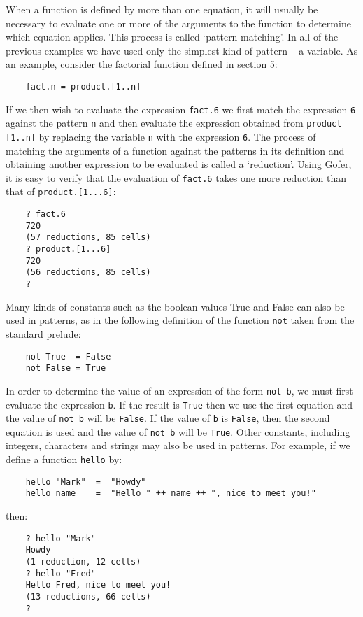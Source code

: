 When a function is defined by more than one equation, it  will  usually
be necessary to evaluate one or more of the arguments to  the  function
to  determine  which  equation  applies.   This   process   is   called
`pattern-matching'.  In all of the previous examples we have used  only
the simplest kind of pattern -- a variable.  As  an  example,  consider
the factorial function defined in section 5:
\begin{verbatim}
    fact.n = product.[1..n]
\end{verbatim}
If we then wish to evaluate the expression \verb"fact.6" we first match  the
expression \verb"6" against the pattern \verb"n" 
and then evaluate the expression
obtained from \verb"product [1..n]" by replacing 
the variable \verb"n"  with  the
expression \verb"6".  The process of matching the arguments  of  a  function
against the patterns in its definition and obtaining another expression
to be evaluated is called a `reduction'.  Using Gofer, it  is  easy  to
verify that the evaluation of \verb"fact.6" takes one  more  reduction  than
that of \verb"product.[1...6]":
\begin{verbatim}
    ? fact.6
    720
    (57 reductions, 85 cells)
    ? product.[1...6]
    720
    (56 reductions, 85 cells)
    ? 
\end{verbatim}
Many kinds of constants such as the boolean values True and  False  can
also be used in  patterns,  as  in  the  following  definition  of  the
function \verb"not" taken from the standard prelude:
\begin{verbatim}
    not True  = False
    not False = True
\end{verbatim}
In order to determine the value of an expression of the form  \verb"not b",
we must first evaluate the expression \verb"b".  If  the  result  is  \verb"True"
then we use the first equation  and  the  value  of  \verb"not b"  will  be
\verb"False".  If the value of \verb"b" is \verb"False", then the second  equation  is
used and the value of \verb"not b" will be \verb"True".
Other constants, including integers, characters and strings may also be
used in patterns.  For example, if we define a function \verb"hello" by:
\begin{verbatim}
    hello "Mark"  =  "Howdy"
    hello name    =  "Hello " ++ name ++ ", nice to meet you!"
\end{verbatim}
then:
\begin{verbatim}
    ? hello "Mark"
    Howdy
    (1 reduction, 12 cells)
    ? hello "Fred"
    Hello Fred, nice to meet you!
    (13 reductions, 66 cells)
    ?
\end{verbatim}
